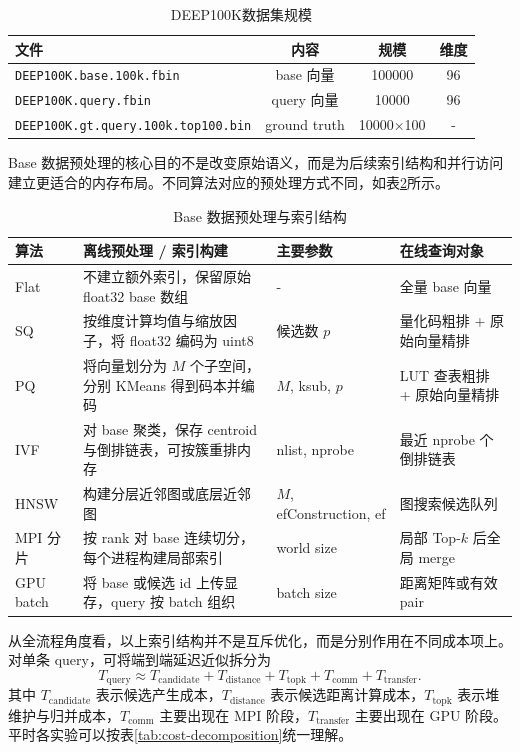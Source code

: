 \documentclass[a4paper]{article}
\newcommand{\deep}{DEEP100K}
\begin{document}
\begin{table}[H]
\centering
\caption{\deep 数据集规模}
\label{tab:dataset}
\begin{tabular}{lccc}
\toprule
文件 & 内容 & 规模 & 维度 \\
\midrule
\texttt{DEEP100K.base.100k.fbin} & base 向量 & 100000 & 96 \\
\texttt{DEEP100K.query.fbin} & query 向量 & 10000 & 96 \\
\texttt{DEEP100K.gt.query.100k.top100.bin} & ground truth & 10000$\times$100 & - \\
\bottomrule
\end{tabular}
\end{table}

Base 数据预处理的核心目的不是改变原始语义，而是为后续索引结构和并行访问建立更适合的内存布局。不同算法对应的预处理方式不同，如表\ref{tab:index-structures}所示。

\begin{table}[H]
\centering
\small
\caption{Base 数据预处理与索引结构}
\label{tab:index-structures}
\begin{tabularx}{\textwidth}{lXlX}
\toprule
算法 & 离线预处理 / 索引构建 & 主要参数 & 在线查询对象 \\
\midrule
Flat & 不建立额外索引，保留原始 float32 base 数组 & - & 全量 base 向量 \\
SQ & 按维度计算均值与缩放因子，将 float32 编码为 uint8 & 候选数 $p$ & 量化码粗排 + 原始向量精排 \\
PQ & 将向量划分为 $M$ 个子空间，分别 KMeans 得到码本并编码 & $M$, ksub, $p$ & LUT 查表粗排 + 原始向量精排 \\
IVF & 对 base 聚类，保存 centroid 与倒排链表，可按簇重排内存 & nlist, nprobe & 最近 nprobe 个倒排链表 \\
HNSW & 构建分层近邻图或底层近邻图 & $M$, efConstruction, ef & 图搜索候选队列 \\
MPI 分片 & 按 rank 对 base 连续切分，每个进程构建局部索引 & world size & 局部 Top-$k$ 后全局 merge \\
GPU batch & 将 base 或候选 id 上传显存，query 按 batch 组织 & batch size & 距离矩阵或有效 pair \\
\bottomrule
\end{tabularx}
\end{table}

从全流程角度看，以上索引结构并不是互斥优化，而是分别作用在不同成本项上。对单条 query，可将端到端延迟近似拆分为
\[
T_{\mathrm{query}}\approx
T_{\mathrm{candidate}}+
T_{\mathrm{distance}}+
T_{\mathrm{topk}}+
T_{\mathrm{comm}}+
T_{\mathrm{transfer}}.
\]
其中 $T_{\mathrm{candidate}}$ 表示候选产生成本，$T_{\mathrm{distance}}$ 表示候选距离计算成本，$T_{\mathrm{topk}}$ 表示堆维护与归并成本，$T_{\mathrm{comm}}$ 主要出现在 MPI 阶段，$T_{\mathrm{transfer}}$ 主要出现在 GPU 阶段。平时各实验可以按表\ref{tab:cost-decomposition}统一理解。
\end{document}
